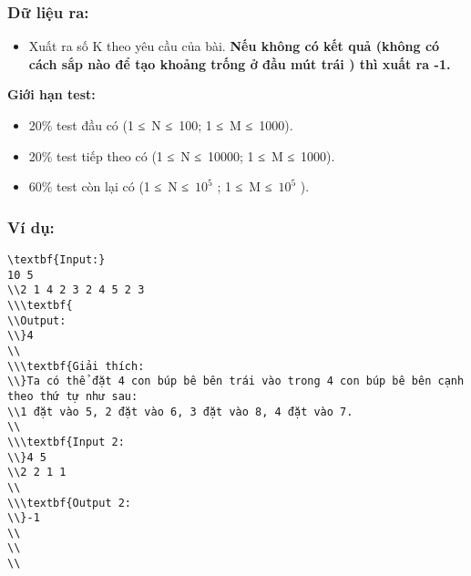 \subsubsection{   Dữ liệu ra:  }
\begin{itemize}
	\item     Xuất ra số K theo yêu cầu của bài.    \textbf{     Nếu không có kết quả (không có cách sắp nào để tạo khoảng trống ở đầu mút trái ) thì xuất ra -1.    }
\end{itemize}

\textbf{     Giới hạn test:    }
\begin{itemize}
	\item      20\% test đầu có (1 ≤ N ≤ 100; 1 ≤ M ≤ 1000).    
	\item      20\% test tiếp theo có           (1 ≤ N ≤ 10000; 1 ≤ M ≤ 1000).     
	\item        60\% test còn lại có (1 ≤ N ≤ $10^{5}$       ; 1 ≤ M ≤ $10^{5}$       ).      
\end{itemize}
\begin{itemize}
\end{itemize}

\subsubsection{   Ví dụ:  }
\begin{verbatim}
\textbf{Input:}
10 5
\\2 1 4 2 3 2 4 5 2 3
\\\textbf{
\\Output:
\\}4
\\
\\\textbf{Giải thích: 
\\}Ta có thể đặt 4 con búp bê bên trái vào trong 4 con búp bê bên cạnh theo thứ tự như sau: 
\\1 đặt vào 5, 2 đặt vào 6, 3 đặt vào 8, 4 đặt vào 7.
\\
\\\textbf{Input 2:
\\}4 5
\\2 2 1 1
\\
\\\textbf{Output 2:
\\}-1
\\
\\
\\\end{verbatim}
